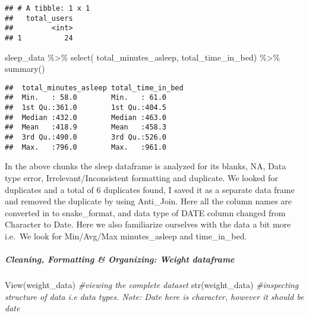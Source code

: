 \documentclass[
]{article}
\newenvironment{Shaded}{\begin{snugshade}}{\end{snugshade}}
\newcommand{\AttributeTok}[1]{\textcolor[rgb]{0.77,0.63,0.00}{#1}}
\newcommand{\CommentTok}[1]{\textcolor[rgb]{0.56,0.35,0.01}{\textit{#1}}}
\newcommand{\FunctionTok}[1]{\textcolor[rgb]{0.00,0.00,0.00}{#1}}
\newcommand{\NormalTok}[1]{#1}
\newcommand{\SpecialCharTok}[1]{\textcolor[rgb]{0.00,0.00,0.00}{#1}}
\begin{document}
\begin{Shaded}
\end{Shaded}

\begin{verbatim}
## # A tibble: 1 x 1
##   total_users
##         <int>
## 1          24
\end{verbatim}

\begin{Shaded}
\begin{Highlighting}[]
\NormalTok{sleep\_data }\SpecialCharTok{\%\textgreater{}\%}
\FunctionTok{select}\NormalTok{(}
\NormalTok{total\_minutes\_asleep,}
\NormalTok{total\_time\_in\_bed) }\SpecialCharTok{\%\textgreater{}\%}
\FunctionTok{summary}\NormalTok{()}
\end{Highlighting}
\end{Shaded}

\begin{verbatim}
##  total_minutes_asleep total_time_in_bed
##  Min.   : 58.0        Min.   : 61.0    
##  1st Qu.:361.0        1st Qu.:404.5    
##  Median :432.0        Median :463.0    
##  Mean   :418.9        Mean   :458.3    
##  3rd Qu.:490.0        3rd Qu.:526.0    
##  Max.   :796.0        Max.   :961.0
\end{verbatim}

In the above chunks the sleep dataframe is analyzed for its blanks, NA,
Data type error, Irrelevant/Inconsistent formatting and duplicate. We
looked for duplicates and a total of 6 duplicates found, I saved it as a
separate data frame and removed the duplicate by using Anti\_Join. Here
all the column names are converted in to snake\_format, and data type of
DATE column changed from Character to Date. Here we also familiarize
ourselves with the data a bit more i.e.~We look for Min/Avg/Max
minutes\_asleep and time\_in\_bed.

\hypertarget{cleaning-formatting-organizing-weight-dataframe}{%
\subparagraph{\texorpdfstring{\textbf{Cleaning, Formatting \&
Organizing: Weight
dataframe}}{Cleaning, Formatting \& Organizing: Weight dataframe}}\label{cleaning-formatting-organizing-weight-dataframe}}

\begin{Shaded}
\begin{Highlighting}[]
 \FunctionTok{View}\NormalTok{(weight\_data) }\CommentTok{\#viewing the complete dataset}
 \FunctionTok{str}\NormalTok{(weight\_data) }\CommentTok{\#inspecting structure of data i.e data types. Note: Date here is character, however it should be date}
\end{Highlighting}
\end{Shaded}
\end{document}

